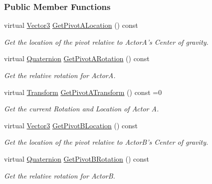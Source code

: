 \subsubsection*{Public Member Functions}
\begin{DoxyCompactItemize}
\item 
virtual \hyperlink{classphys_1_1Vector3}{Vector3} \hyperlink{classphys_1_1DualTransformConstraint_a0458c4b3d9bad6aa8b725a35e922ca05}{GetPivotALocation} () const 
\begin{DoxyCompactList}\small\item\em Get the location of the pivot relative to ActorA's Center of gravity. \item\end{DoxyCompactList}\item 
virtual \hyperlink{classphys_1_1Quaternion}{Quaternion} \hyperlink{classphys_1_1DualTransformConstraint_a9b432b31d4628a07c369bb644e126796}{GetPivotARotation} () const 
\begin{DoxyCompactList}\small\item\em Get the relative rotation for ActorA. \item\end{DoxyCompactList}\item 
virtual \hyperlink{classphys_1_1Transform}{Transform} \hyperlink{classphys_1_1DualTransformConstraint_a2c6e75dca5399af5ff59a9a11f22b50b}{GetPivotATransform} () const =0
\begin{DoxyCompactList}\small\item\em Get the current Rotation and Location of Actor A. \item\end{DoxyCompactList}\item 
virtual \hyperlink{classphys_1_1Vector3}{Vector3} \hyperlink{classphys_1_1DualTransformConstraint_a7a51a331dea27522f6d596bf3aff5de4}{GetPivotBLocation} () const 
\begin{DoxyCompactList}\small\item\em Get the location of the pivot relative to ActorB's Center of gravity. \item\end{DoxyCompactList}\item 
virtual \hyperlink{classphys_1_1Quaternion}{Quaternion} \hyperlink{classphys_1_1DualTransformConstraint_a2d2ba7c3ecf5519c435dd9e0cb103fd0}{GetPivotBRotation} () const 
\begin{DoxyCompactList}\small\item\em Get the relative rotation for ActorB. \item\end{DoxyCompactList}\item 

\end{DoxyCompactItemize}
